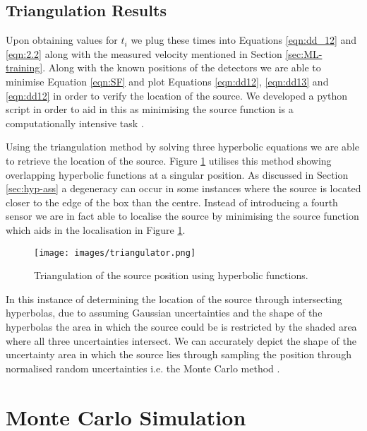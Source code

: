\subsection{Triangulation Results}

Upon obtaining values for $t_i$ we plug these times into Equations \ref{eqn:dd_12} and \ref{eqn:2.2} along with the measured velocity mentioned in Section \ref{sec:ML-training}. Along with the known positions of the detectors we are able to minimise Equation \ref{eqn:SF} and plot Equations \ref{eqn:dd12}, \ref{eqn:dd13} and \ref{eqn:dd12} in order to verify the location of the source. We developed a python script in order to aid in this as minimising the source function is a computationally intensive task \cite{boxer_2025_15041819}. 

Using the triangulation method by solving three hyperbolic equations we are able to retrieve the location of the source. Figure \ref{fig:triangulation} utilises this method showing overlapping hyperbolic functions at a singular position. As discussed in Section \ref{sec:hyp-ass} a degeneracy can occur in some instances where the source is located closer to the edge of the box than the centre. Instead of introducing a fourth sensor we are in fact able to localise the source by minimising the source function which aids in the localisation in Figure \ref{fig:triangulation}. 

\begin{figure}
    \centering
    \texttt{[image: images/triangulator.png]}
    \caption{Triangulation of the source position using hyperbolic functions.}
    \label{fig:triangulation}
\end{figure}

In this instance of determining the location of the source through intersecting hyperbolas, due to assuming Gaussian uncertainties and the shape of the hyperbolas the area in which the source could be is restricted by the shaded area where all three uncertainties intersect. We can accurately depict the shape of the uncertainty area in which the source lies through sampling the position through normalised random uncertainties i.e. the Monte Carlo method \cite{boxer_2025_15041819}. 

\section{Monte Carlo Simulation}

